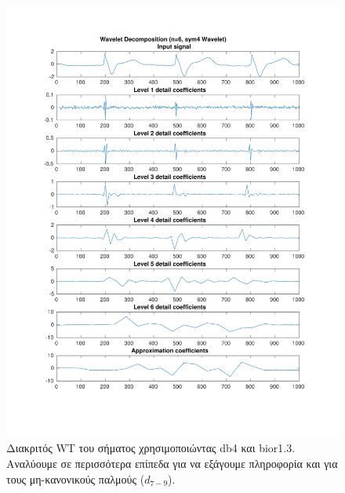\documentclass[11pt,a4paper]{article}
\begin{document}
\begin{figure}[H]
\begin{minipage}{0.46\textwidth}
	\includegraphics[width=\textwidth]{fig/217l1_dwt2.pdf}
\end{minipage}
\vfill
\caption{Διακριτός WT του σήματος χρησιμοποιώντας db4 και bior1.3. Αναλύουμε σε περισσότερα επίπεδα για να εξάγουμε πληροφορία και για τους μη-κανονικούς παλμούς ($d_{7-9}$).}
\label{fig:217l1_dwt}
\end{figure}
\end{document}
